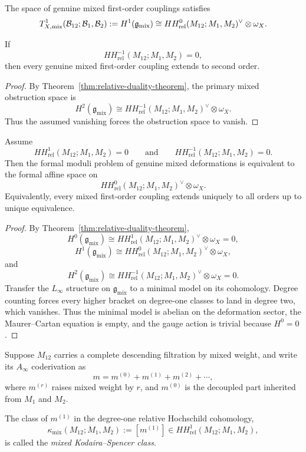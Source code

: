 \begin{corollary}
The space of genuine mixed first-order couplings satisfies
\[
T^1_{X,\mathrm{mix}}(\mathcal{B}_{12};\mathcal{B}_1,\mathcal{B}_2)
:= H^1(\mathfrak g_{\mathrm{mix}})
\cong
HH^{0}_{\mathrm{rel}}(M_{12};M_1,M_2)^\vee\otimes \omega_X.
\]
\end{corollary}

\begin{corollary}
If
\[
HH^{-1}_{\mathrm{rel}}(M_{12};M_1,M_2)=0,
\]
then every genuine mixed first-order coupling extends to second order.
\end{corollary}

\begin{proof}
By Theorem~\ref{thm:relative-duality-theorem}, the primary mixed obstruction space is
\[
H^2(\mathfrak g_{\mathrm{mix}})
\cong
HH^{-1}_{\mathrm{rel}}(M_{12};M_1,M_2)^\vee\otimes \omega_X.
\]
Thus the assumed vanishing forces the obstruction space to vanish.
\end{proof}

\begin{theorem}
Assume
\[
HH^{1}_{\mathrm{rel}}(M_{12};M_1,M_2)=0
\qquad\text{and}\qquad
HH^{-1}_{\mathrm{rel}}(M_{12};M_1,M_2)=0.
\]
Then the formal moduli problem of genuine mixed deformations is equivalent to the formal affine space on
\[
HH^{0}_{\mathrm{rel}}(M_{12};M_1,M_2)^\vee\otimes \omega_X.
\]
Equivalently, every mixed first-order coupling extends uniquely to all orders up to unique equivalence.
\end{theorem}

\begin{proof}
By Theorem~\ref{thm:relative-duality-theorem},
\[
H^0(\mathfrak g_{\mathrm{mix}})
\cong HH^{1}_{\mathrm{rel}}(M_{12};M_1,M_2)^\vee\otimes \omega_X=0,
\]
\[
H^1(\mathfrak g_{\mathrm{mix}})
\cong HH^{0}_{\mathrm{rel}}(M_{12};M_1,M_2)^\vee\otimes \omega_X,
\]
and
\[
H^2(\mathfrak g_{\mathrm{mix}})
\cong HH^{-1}_{\mathrm{rel}}(M_{12};M_1,M_2)^\vee\otimes \omega_X=0.
\]
Transfer the $L_\infty$ structure on $\mathfrak g_{\mathrm{mix}}$ to a minimal model on its cohomology. Degree counting forces every higher bracket on degree-one classes to land in degree two, which vanishes. Thus the minimal model is abelian on the deformation sector, the Maurer--Cartan equation is empty, and the gauge action is trivial because $H^0=0$.
\end{proof}

\begin{definition}
Suppose $M_{12}$ carries a complete descending filtration by mixed weight, and write its $A_\infty$ coderivation as
\[
m = m^{(0)} + m^{(1)} + m^{(2)} + \cdots,
\]
where $m^{(r)}$ raises mixed weight by $r$, and $m^{(0)}$ is the decoupled part inherited from $M_1$ and $M_2$.

The class of $m^{(1)}$ in the degree-one relative Hochschild cohomology,
\[
\kappa_{\mathrm{mix}}(M_{12};M_1,M_2)
:= [m^{(1)}]
\in HH^{1}_{\mathrm{rel}}(M_{12};M_1,M_2),
\]
is called the \emph{mixed Kodaira--Spencer class}.
\end{definition}

